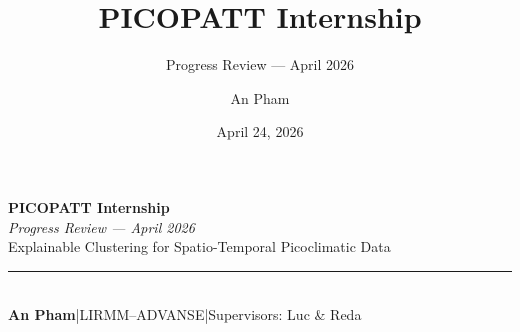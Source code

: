 \documentclass[aspectratio=169]{beamer}
\title{\textbf{PICOPATT Internship}}
\subtitle{Progress Review --- April 2026}
\author{An Pham}
\institute{LIRMM--ADVANSE, Universit\'e de Montpellier}
\date{April 24, 2026}
\begin{document}
{
\begin{frame}[plain]
\vspace{1.1cm}
{\color{white}\huge\bfseries PICOPATT Internship}\\[5pt]
{\color{cteal}\large\itshape Progress Review --- April 2026}\\[8pt]
{\color{caccent}\small Explainable Clustering for Spatio-Temporal Picoclimatic Data}\\[0.6cm]
{\color{cmid}\rule{4.5cm}{0.8pt}}\\[5pt]
{\color{caccent}\footnotesize\textbf{An Pham}\quad|\quad LIRMM--ADVANSE\quad|\quad Supervisors: Luc \& Reda}
\end{frame}}
\end{document}
